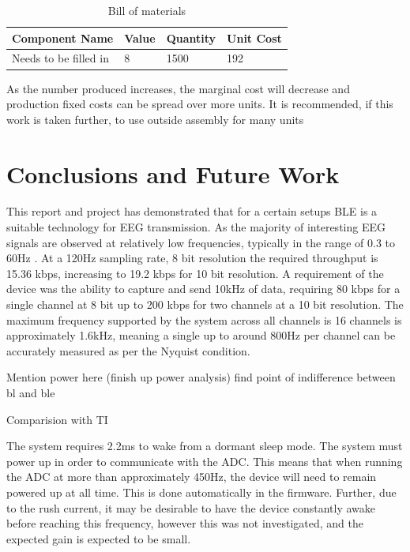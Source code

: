 \documentclass[]{article}
\begin{document}
\begin{table}[H]
\centering
\caption{Bill of materials}
\label{fig:sensors}
\begin{tabular}{|p{1.1in}|p{1.1in}|p{1.1in}|p{1.1in}|} \hline 
\textbf{Component Name} & \textbf{Value} & \textbf{Quantity} & \textbf{Unit Cost} \\ \hline 
Needs to be filled in & 8 & 1500 & 192 \\ \hline  



\end{tabular}
\end{table}

As the number produced increases, the marginal cost will decrease and production fixed costs can be spread over more units. It is recommended, if this work is taken further, to use outside assembly for many units

\clearpage 
\section{Conclusions and Future Work}

This report and project has demonstrated that for a certain setups \ac{BLE} is a suitable technology for \ac{EEG} transmission. As the majority of interesting \ac{EEG} signals are observed at relatively low frequencies, typically in the range of 0.3 to 60Hz \cite{eeeman}. At a 120Hz sampling rate, 8 bit resolution the required throughput is 15.36 kbps, increasing to 19.2 kbps for 10 bit resolution. A requirement of the device was the ability to capture and send 10kHz of data, requiring 80 kbps for a single channel at 8 bit up to 200 kbps for two channels at a 10 bit resolution. The maximum frequency supported by the system across all channels is 16 channels is approximately 1.6kHz, meaning a single up to around 800Hz per channel can be accurately measured as per the Nyquist condition. 

Mention power here (finish up power analysis)
find point of indifference between bl and ble

Comparision with TI

The system requires 2.2ms to wake from a dormant sleep mode. The system must power up in order to communicate with the \ac{ADC}. This means that when running the \ac{ADC} at more than approximately 450Hz, the device will need to remain powered up at all time. This is done automatically in the firmware. Further, due to the rush current, it may be desirable to have the device constantly awake before reaching this frequency, however this was not investigated, and the expected gain is expected to be small. 
\end{document}
